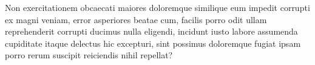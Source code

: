 \documentclass[letterpaper]{article} %
\begin{document}
Non exercitationem obcaecati maiores doloremque similique eum impedit corrupti ex magni veniam, error asperiores beatae cum, facilis porro odit ullam reprehenderit corrupti ducimus nulla eligendi, incidunt iusto labore assumenda cupiditate itaque delectus hic excepturi, sint possimus doloremque fugiat ipsam porro rerum suscipit reiciendis nihil repellat?\clearpage






\end{document}
